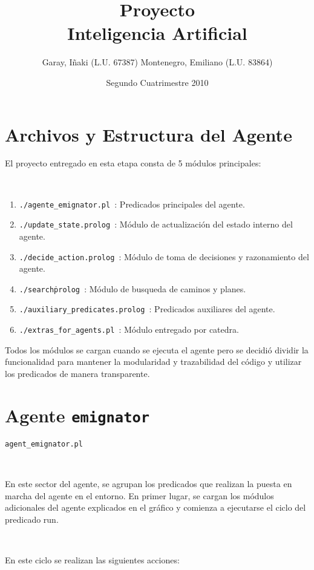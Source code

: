 \documentclass[a4paper,12pt]{report}
\title{Proyecto \\ Inteligencia Artificial}
\author{Garay, I\~{n}aki (L.U. 67387) Montenegro, Emiliano (L.U. 83864)}
\date{Segundo Cuatrimestre 2010}
\begin{document}
\maketitle
\tableofcontents

\chapter{Archivos y Estructura del Agente}

El proyecto entregado en esta etapa consta de 5 m\'{o}dulos principales:

\

\begin{enumerate}
\item \texttt{./agente\_emignator.pl         }: Predicados principales del agente. 
\item \texttt{./update\_state.prolog         }: M\'{o}dulo de actualizaci\'{o}n del estado interno del agente.
\item \texttt{./decide\_action.prolog        }: M\'{o}dulo de toma de decisiones y razonamiento del agente. 
\item \texttt{./search\.prolog               }: M\'{o}dulo de busqueda de caminos y planes. 
\item \texttt{./auxiliary\_predicates.prolog }: Predicados auxiliares del agente.
\item \texttt{./extras\_for\_agents.pl       }: M\'{o}dulo entregado por catedra.
\end{enumerate}

Todos los m\'{o}dulos se cargan cuando se ejecuta el agente pero se decidi\'{o} dividir la 
funcionalidad para mantener la modularidad y trazabilidad del c\'{o}digo y utilizar los predicados 
de manera transparente.

\chapter{Agente \texttt{emignator}}

\texttt{agent\_emignator.pl}

\ 

En este sector del agente, se agrupan los predicados que realizan la puesta en marcha del agente en 
el entorno. 
En primer lugar, se cargan los m\'{o}dulos adicionales del agente explicados en el gr\'{a}fico y 
comienza a ejecutarse el ciclo del predicado run.

\ 

En este ciclo se realizan las siguientes acciones:
\end{document}
